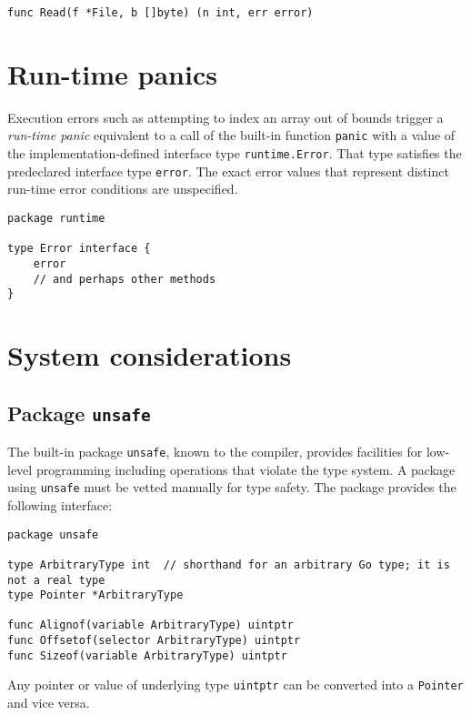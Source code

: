 {\begin{Verbatim}[frame=single]
func Read(f *File, b []byte) (n int, err error)
\end{Verbatim}

\section*{Run-time panics}

Execution errors such as attempting to index an array out of bounds
trigger a \emph{run-time panic} equivalent to a call of the built-in
function \texttt{panic} with a value of the
implementation-defined interface type \texttt{runtime.Error}. That type
satisfies the predeclared interface type
\texttt{error}. The exact error values that represent
distinct run-time error conditions are unspecified.

\begin{Verbatim}[frame=single]
package runtime

type Error interface {
    error
    // and perhaps other methods
}
\end{Verbatim}

\section*{System considerations}

\subsection*{Package \texttt{unsafe}}

The built-in package \texttt{unsafe}, known to the compiler, provides
facilities for low-level programming including operations that violate
the type system. A package using \texttt{unsafe} must be vetted manually
for type safety. The package provides the following interface:

\begin{Verbatim}[frame=single]
package unsafe

type ArbitraryType int  // shorthand for an arbitrary Go type; it is not a real type
type Pointer *ArbitraryType

func Alignof(variable ArbitraryType) uintptr
func Offsetof(selector ArbitraryType) uintptr
func Sizeof(variable ArbitraryType) uintptr
\end{Verbatim}

Any pointer or value of underlying type
\texttt{uintptr} can be converted into a \texttt{Pointer} and vice
versa.

}
